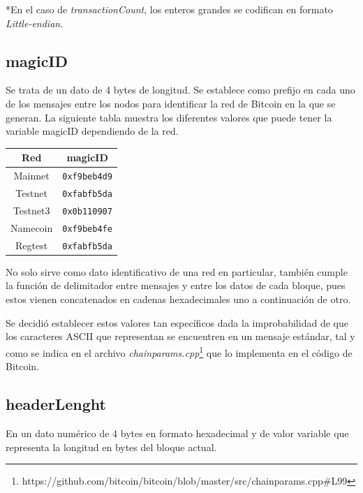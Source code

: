 \documentclass{article}
\begin{document}
    *En el caso de \textit{transactionCount}, los enteros grandes se codifican en formato \textit{Little-endian}.
    
    \subsection{magicID}
    Se trata de un dato de 4 bytes de longitud. Se establece como prefijo en cada uno de los mensajes entre los nodos para identificar la red de Bitcoin en la que se generan. La siguiente tabla muestra los diferentes valores que puede tener la variable magicID dependiendo de la red.
    
    \begin{table}[H]
    \centering
    \begin{tabular}{| c | c |} 
        \hline
        Red & magicID \\
        \hline
        Mainnet & \texttt{0xf9beb4d9} \\
        \hline
        Testnet & \texttt{0xfabfb5da} \\
        \hline
        Testnet3 & \texttt{0x0b110907} \\
        \hline
        Namecoin & \texttt{0xf9beb4fe} \\
        \hline
        Regtest & \texttt{0xfabfb5da} \\
        \hline
    \end{tabular}
    \label{table:1}
    \end{table}
    
    No solo sirve como dato identificativo de una red en particular, también cumple la función de delimitador entre mensajes y entre los datos de cada bloque, pues estos vienen concatenados en cadenas hexadecimales uno a continuación de otro.
    
    Se decidió establecer estos valores tan específicos dada la improbabilidad de que los caracteres ASCII que representan se encuentren en un mensaje estándar, tal y como se indica en el archivo \textit{chainparams.cpp}\footnote{https://github.com/bitcoin/bitcoin/blob/master/src/chainparams.cpp\#L99} que lo implementa en el código de Bitcoin.
    
    \subsection{headerLenght}
    En un dato numérico de 4 bytes en formato hexadecimal y de valor variable que representa la longitud en bytes del bloque actual.
    
\end{document}
